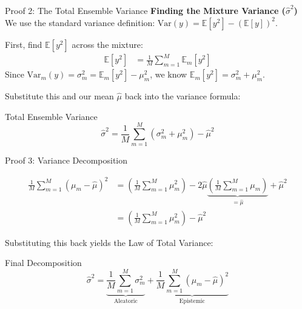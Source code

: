 \documentclass[aspectratio=169]{beamer}
\begin{document}
\begin{frame}{Proof 2: The Total Ensemble Variance}
  \textbf{Finding the Mixture Variance ($\hat{\sigma}^2$)} \\
  We use the standard variance definition: $\text{Var}(y) = \mathbb{E}[y^2] - (\mathbb{E}[y])^2$.
  

  First, find $\mathbb{E}[y^2]$ across the mixture:
  \begin{align*}
    \mathbb{E}[y^2] &= \frac{1}{M} \sum_{m=1}^M \mathbb{E}_m[y^2] 
  \end{align*}
  Since $\text{Var}_m(y) = \sigma_m^2 = \mathbb{E}_m[y^2] - \mu_m^2$, we know $\mathbb{E}_m[y^2] = \sigma_m^2 + \mu_m^2$.
  

  Substitute this and our mean $\hat{\mu}$ back into the variance formula:
  \begin{block}{Total Ensemble Variance}
    \[ \hat{\sigma}^2 = \frac{1}{M} \sum_{m=1}^M (\sigma_m^2 + \mu_m^2) - \hat{\mu}^2 \]
  \end{block}
\end{frame}

\begin{frame}{Proof 3: Variance Decomposition}


  \begin{align*}
    \frac{1}{M}\sum_{m=1}^M (\mu_m - \hat{\mu})^2 
    &= \left(\frac{1}{M}\sum_{m=1}^M \mu_m^2\right) - 2\hat{\mu}\underbrace{\left(\frac{1}{M}\sum_{m=1}^M \mu_m\right)}_{=\hat{\mu}} + \hat{\mu}^2 \\
    &= \left(\frac{1}{M}\sum_{m=1}^M \mu_m^2\right) - \hat{\mu}^2
  \end{align*}

  Substituting this back yields the Law of Total Variance:
  \begin{block}{Final Decomposition}
    \[ \hat{\sigma}^2 = \underbrace{\frac{1}{M}\sum_{m=1}^M\sigma_m^2}_{\text{Aleatoric}} + \underbrace{\frac{1}{M}\sum_{m=1}^M(\mu_m - \hat{\mu})^2}_{\text{Epistemic}} \]
  \end{block}
\end{frame}
\end{document}
